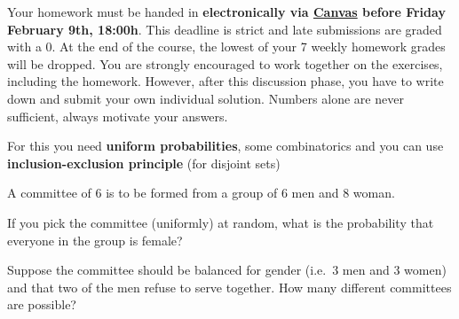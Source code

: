 \documentclass[a4paper,10pt,landscape,twocolumn]{scrartcl}
\newcommand\deadline{Friday February 9th, 18:00h}
\begin{document}
\homeworkproblems

{\sffamily\noindent
Your homework must be handed in \textbf{electronically via \href{https://canvas.uva.nl}{Canvas} before \deadline}. This deadline is strict and late submissions are graded with a 0. At the end of the course, the lowest of your 7 weekly homework grades will be dropped. You are strongly encouraged to work together on the exercises, including the homework. However, after this discussion phase, you have to write down and submit your own individual solution. Numbers alone are never sufficient, always motivate your answers.
}

	
\begin{exercise}[Committees (3pt)]
	\begin{mycomment}
		For this you need \textbf{uniform probabilities}, some combinatorics and you can use \textbf{inclusion-exclusion principle} (for disjoint sets)
	\end{mycomment}

	A committee of 6 is to be formed from a group of 6 men and 8 woman.

	\begin{subex}[1pt]
	If you pick the committee (uniformly) at random, what is the probability that everyone in the group is female?
	\end{subex}

	\begin{subex}[2pt]
		Suppose the committee should be balanced for gender
                (i.e.\ 3 men and 3 women) and that two of the men refuse to serve together. How many different committees are possible?
	\end{subex}
\end{exercise}
\end{document}
